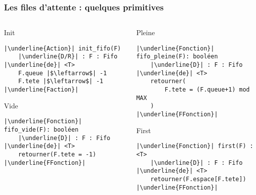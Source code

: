 \documentclass[table,handout,tikz,12pt,svgnames]{beamer}
\begin{document}
\begin{frame}[fragile=singleslide]
	\frametitle{Les files d'attente : quelques primitives}
	\begin{block}{}
		\begin{columns}[T]
			\hspace{-2.2cm}
			\begin{column}{0.7\textwidth}
				\begin{block}{Init} %
					\begin{verbatim}
|\underline{Action}| init_fifo(F)
	|\underline{D/R}| : F : Fifo |\underline{de}| <T>
	F.queue |$\leftarrow$| -1
	F.tete |$\leftarrow$| -1
|\underline{Faction}|
					\end{verbatim}
				\end{block}
				\begin{block}{Vide} %
					\begin{verbatim}
|\underline{Fonction}| fifo_vide(F): booléen
	|\underline{D}| : F : Fifo |\underline{de}| <T>
	retourner(F.tete = -1)
|\underline{FFonction}|
					\end{verbatim}
				\end{block}
			\end{column}
			\hspace{-4.25cm}
			\vrule{}
			\hspace{0cm}
			\begin{column}{0.38\textwidth}
				\begin{block}{Pleine} %
					\begin{verbatim}
|\underline{Fonction}| fifo_pleine(F): booléen
	|\underline{D}| : F : Fifo |\underline{de}| <T>
	retourner(
		F.tete = (F.queue+1) mod MAX
	)
|\underline{FFonction}|
					\end{verbatim}
				\end{block}
				\begin{block}{First} %
					\begin{verbatim}
|\underline{Fonction}| first(F) : <T>
	|\underline{D}| : F : Fifo |\underline{de}| <T>
	retourner(F.espace[F.tete])
|\underline{FFonction}|
					\end{verbatim}
				\end{block}		
			\end{column}
		\end{columns}
	\end{block}
\end{frame}
\end{document}
